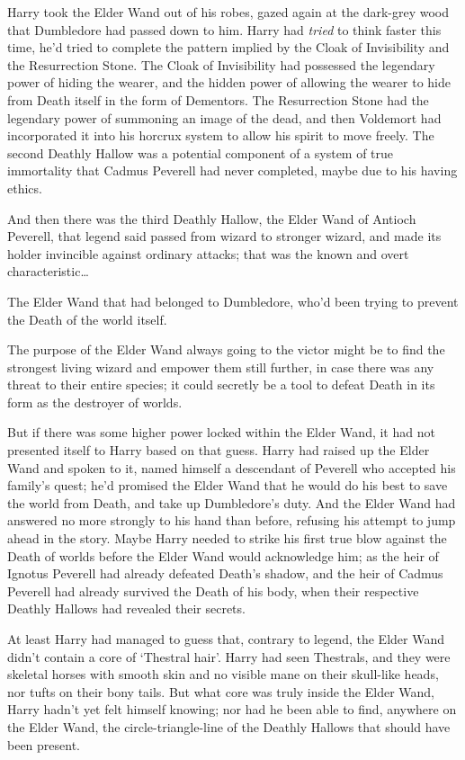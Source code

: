Harry took the Elder Wand out of his robes, gazed again at the dark-grey wood that Dumbledore had passed down to him. Harry had \emph{tried} to think faster this time, he’d tried to complete the pattern implied by the Cloak of Invisibility and the Resurrection Stone. The Cloak of Invisibility had possessed the legendary power of hiding the wearer, and the hidden power of allowing the wearer to hide from Death itself in the form of Dementors. The Resurrection Stone had the legendary power of summoning an image of the dead, and then Voldemort had incorporated it into his horcrux system to allow his spirit to move freely. The second Deathly Hallow was a potential component of a system of true immortality that Cadmus Peverell had never completed, maybe due to his having ethics.

And then there was the third Deathly Hallow, the Elder Wand of Antioch Peverell, that legend said passed from wizard to stronger wizard, and made its holder invincible against ordinary attacks; that was the known and overt characteristic…

The Elder Wand that had belonged to Dumbledore, who’d been trying to prevent the Death of the world itself.

The purpose of the Elder Wand always going to the victor might be to find the strongest living wizard and empower them still further, in case there was any threat to their entire species; it could secretly be a tool to defeat Death in its form as the destroyer of worlds.

But if there was some higher power locked within the Elder Wand, it had not presented itself to Harry based on that guess. Harry had raised up the Elder Wand and spoken to it, named himself a descendant of Peverell who accepted his family’s quest; he’d promised the Elder Wand that he would do his best to save the world from Death, and take up Dumbledore’s duty. And the Elder Wand had answered no more strongly to his hand than before, refusing his attempt to jump ahead in the story. Maybe Harry needed to strike his first true blow against the Death of worlds before the Elder Wand would acknowledge him; as the heir of Ignotus Peverell had already defeated Death’s shadow, and the heir of Cadmus Peverell had already survived the Death of his body, when their respective Deathly Hallows had revealed their secrets.

At least Harry had managed to guess that, contrary to legend, the Elder Wand didn’t contain a core of ‘Thestral hair’. Harry had seen Thestrals, and they were skeletal horses with smooth skin and no visible mane on their skull-like heads, nor tufts on their bony tails. But what core was truly inside the Elder Wand, Harry hadn’t yet felt himself knowing; nor had he been able to find, anywhere on the Elder Wand, the circle-triangle-line of the Deathly Hallows that should have been present.

